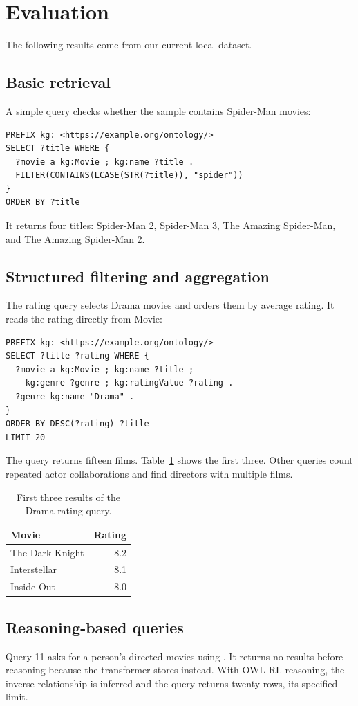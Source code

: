 \section{Evaluation}\label{sec:eval}
The following results come from our current local dataset.

\subsection{Basic retrieval}
A simple query checks whether the sample contains Spider-Man movies:
\begin{lstlisting}
PREFIX kg: <https://example.org/ontology/>
SELECT ?title WHERE {
  ?movie a kg:Movie ; kg:name ?title .
  FILTER(CONTAINS(LCASE(STR(?title)), "spider"))
}
ORDER BY ?title
\end{lstlisting}
It returns four titles: Spider-Man 2, Spider-Man 3, The Amazing Spider-Man, and The Amazing Spider-Man 2.

\subsection{Structured filtering and aggregation}
The rating query selects Drama movies and orders them by average rating. It reads the rating directly from Movie:
\begin{lstlisting}
PREFIX kg: <https://example.org/ontology/>
SELECT ?title ?rating WHERE {
  ?movie a kg:Movie ; kg:name ?title ;
    kg:genre ?genre ; kg:ratingValue ?rating .
  ?genre kg:name "Drama" .
}
ORDER BY DESC(?rating) ?title
LIMIT 20
\end{lstlisting}
The query returns fifteen films. Table~\ref{tab:rating} shows the first three. Other queries count repeated actor collaborations and find directors with multiple films.
\begin{table}[h]
\caption{First three results of the Drama rating query.}
\label{tab:rating}\centering\small
\begin{tabular}{lr}
\toprule Movie & Rating\\\midrule
The Dark Knight & 8.2\\
Interstellar & 8.1\\
Inside Out & 8.0\\
\bottomrule\end{tabular}
\end{table}

\subsection{Reasoning-based queries}
Query 11 asks for a person's directed movies using . It returns no results before reasoning because the transformer stores  instead. With OWL-RL reasoning, the inverse relationship is inferred and the query returns twenty rows, its specified limit.

